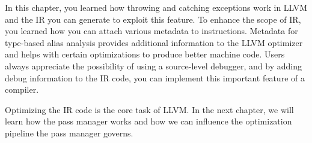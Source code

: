 In this chapter, you learned how throwing and catching exceptions work in LLVM and the IR you can generate to exploit this feature. To enhance the scope of IR, you learned how you can attach various metadata to instructions. Metadata for type-based alias analysis provides additional information to the LLVM optimizer and helps with certain optimizations to produce better machine code. Users always appreciate the possibility of using a source-level debugger, and by adding debug information to the IR code, you can implement this important feature of a compiler.

Optimizing the IR code is the core task of LLVM. In the next chapter, we will learn how the pass manager works and how we can influence the optimization pipeline the pass manager governs.